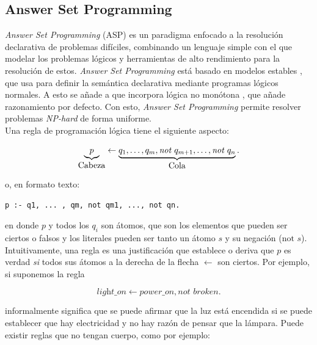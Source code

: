 \subsection{Answer Set Programming}\label{subsec:asp}

\textit{Answer Set Programming} (ASP) \cite{asp} es un paradigma enfocado a la resolución declarativa de problemas difíciles, combinando un lenguaje simple con el que modelar los problemas lógicos y herramientas de alto rendimiento para la resolución de estos. \textit{Answer Set Programming} está basado en modelos estables \cite{stablemodels}, que usa para definir la semántica declarativa mediante programas lógicos normales. A esto se añade a que incorpora lógica no monótona \cite{nonmonotonic}, que añade razonamiento por defecto. Con esto, \textit{Answer Set Programming} permite resolver problemas \textit{NP-hard} de forma uniforme. \\

Una regla de programación lógica tiene el siguiente aspecto:

\begin{equation}
	\underbrace{p}_{\text{\normalsize Cabeza}} \leftarrow \underbrace{q_1, \dotsc, q_m , \textit{not } q_{m+1} ,\dotsc, \textit{not } q_n}_{\text{\normalsize Cola}}.
\end{equation}

\hspace{1em}

o, en formato texto:

\begin{lstlisting}[label=lst:qreached]
p :- q1, ... , qm, not qm1, ..., not qn.
\end{lstlisting}

en donde $p$ y todos los $q_i$ son átomos, que son los elementos que pueden ser ciertos o falsos y los literales pueden ser tanto un átomo $s$ y su negación ($\text{not } s$). Intuitivamente, una regla es una justificación que establece o deriva que $p$ es verdad \textit{si} todos sus átomos a la derecha de la flecha $\leftarrow$ son ciertos. Por ejemplo, si suponemos la regla

\begin{equation}\label{eq:light}
	\textit{light\_on} \leftarrow \textit{power\_on}, \textit{not } broken.
\end{equation}

informalmente significa que se puede afirmar que la luz está encendida si se puede establecer que hay electricidad y no hay razón de pensar que la lámpara. Puede existir reglas que no tengan cuerpo,  como por ejemplo:

